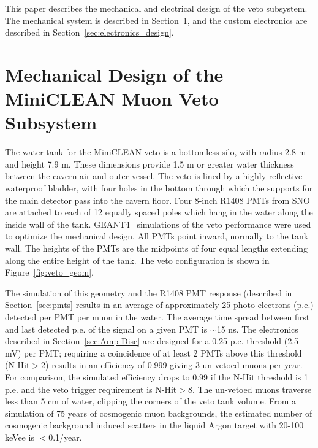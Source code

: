 \documentclass{JINST}
\begin{document}
This paper describes the mechanical and electrical design of the veto
subsystem.  The mechanical system is described in
Section~\ref{sec:subsystem_design}, and the custom electronics are
described in Section~\ref{sec:electronics_design}.


\section{Mechanical Design of the MiniCLEAN Muon Veto Subsystem}
\label{sec:subsystem_design}
%
The water tank for the MiniCLEAN veto is a bottomless silo, with
radius 2.8 m and height 7.9 m. These dimensions provide 1.5 m or
greater water thickness between the cavern air and outer vessel. The
veto is lined by a highly-reflective waterproof bladder, with four
holes in the bottom through which the supports for the main detector
pass into the cavern floor. Four 8-inch R1408 PMTs from SNO are
attached to each of 12 equally spaced poles which hang in the water
along the inside wall of the tank. GEANT4~\cite{ref:geant4} simulations
of the veto performance were used to optimize the mechanical
design. All PMTs point inward, normally to the tank wall. The heights
of the PMTs are the midpoints of four equal lengths extending along
the entire height of the tank. The veto configuration is shown in
Figure~\ref{fig:veto_geom}.  

The simulation of this geometry and the R1408 PMT response (described
in Section~\ref{sec:pmts} results in an average of approximately 25
photo-electrons (p.e.) detected per PMT per muon in the water.  The
average time spread between first and last detected p.e. of the signal
on a given PMT is $\sim$15 ns.  The electronics described in
Section~\ref{sec:Amp-Disc} are designed for a 0.25 p.e. threshold (2.5
mV) per PMT; requiring a coincidence of at least 2 PMTs above this
threshold (N-Hit$>$2) results in an efficiency of 0.999 giving 3
un-vetoed muons per year.  For comparison, the simulated efficiency
drops to 0.99 if the N-Hit threshold is 1 p.e. and the veto trigger
requirement is N-Hit$>$8.  The un-vetoed muons traverse less than 5 cm
of water, clipping the corners of the veto tank volume.  From a
simulation of 75 years of cosmogenic muon backgrounds, the estimated
number of cosmogenic background induced scatters in the liquid Argon
target with 20-100 keVee is $<$0.1/year.
\end{document}
